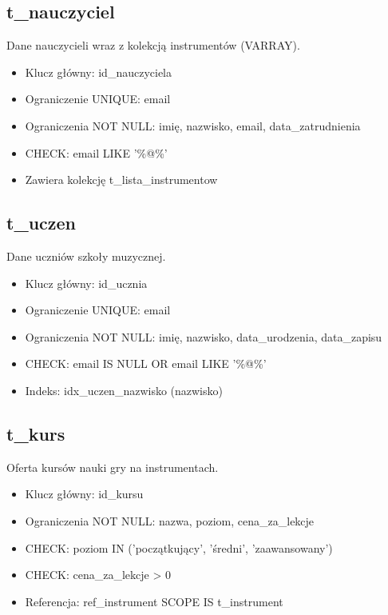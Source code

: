 \documentclass[12pt,a4paper]{article}
\begin{document}
\subsection{t\_nauczyciel}

Dane nauczycieli wraz z kolekcją instrumentów (VARRAY).

\begin{itemize}[nosep]
    \item Klucz główny: id\_nauczyciela
    \item Ograniczenie UNIQUE: email
    \item Ograniczenia NOT NULL: imię, nazwisko, email, data\_zatrudnienia
    \item CHECK: email LIKE '\%@\%'
    \item Zawiera kolekcję t\_lista\_instrumentow
\end{itemize}

\subsection{t\_uczen}

Dane uczniów szkoły muzycznej.

\begin{itemize}[nosep]
    \item Klucz główny: id\_ucznia
    \item Ograniczenie UNIQUE: email
    \item Ograniczenia NOT NULL: imię, nazwisko, data\_urodzenia, data\_zapisu
    \item CHECK: email IS NULL OR email LIKE '\%@\%'
    \item Indeks: idx\_uczen\_nazwisko (nazwisko)
\end{itemize}

\subsection{t\_kurs}

Oferta kursów nauki gry na instrumentach.

\begin{itemize}[nosep]
    \item Klucz główny: id\_kursu
    \item Ograniczenia NOT NULL: nazwa, poziom, cena\_za\_lekcje
    \item CHECK: poziom IN ('początkujący', 'średni', 'zaawansowany')
    \item CHECK: cena\_za\_lekcje > 0
    \item Referencja: ref\_instrument SCOPE IS t\_instrument
\end{itemize}
\end{document}
